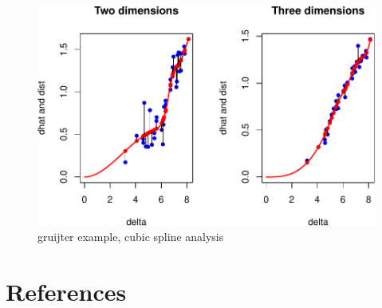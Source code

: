 \documentclass[
  12pt,
]{article}
\begin{document}
\begin{figure}

{\centering \includegraphics{smacofBS_files/figure-latex/gruijtersplines-1} 

}

\caption{gruijter example, cubic spline analysis}\label{fig:gruijtersplines}
\end{figure}

\section*{References}\label{references}
\end{document}
